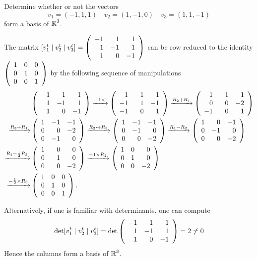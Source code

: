 \documentclass{ximera}
\author{Matthew Carr}
\begin{document}

\begin{exercise}\label{mc5_5A}

Determine whether or not the vectors  %
\[
v_1 = (-1,1,1) \quad v_2 = (1,-1,0) \quad v_3 = (1,1,-1)
\]
form a basis of $\mbox{$\Bbb{R}$}^3$.
  
\begin{solution}
\soln The matrix $[v_1^t\mid v_2^t\mid v_3^t]=\left(\begin{array}{rrrrrrrrrrrrrrrrrr} -1 & 1 & 1\\ 1 & -1 & 1\\ 1 & 0 & -1 \end{array}\right)$ can be row reduced to the identity $\left(\begin{array}{rrrrrrrrrrrrrrrrrr} 1 & 0 & 0\\ 0 & 1 & 0\\ 0 & 0 & 1 \end{array}\right)$ by the following sequence of manipulations
\begin{align*}
&\left(\begin{array}{rrrrrrrrrrrrrrrrrr} -1 & 1 & 1\\ 1 & -1 & 1\\ 1 & 0 & -1 \end{array}\right)\xrightarrow{-1\times }\left(\begin{array}{rrrrrrrrrrrrrrrrrr} 1 & -1 & -1\\ -1 & 1 & -1\\ -1 & 0 & 1 \end{array}\right)\xrightarrow{R_2+R_1}\left(\begin{array}{rrrrrrrrrrrrrrrrrr} 1 & -1 & -1\\ 0 & 0 & -2\\ -1 & 0 & 1 \end{array}\right)\\
\xrightarrow{R_3+R_1}&\left(\begin{array}{rrrrrrrrrrrrrrrrrr} 1 & -1 & -1\\ 0 & 0 & -2\\ 0 & -1 & 0 \end{array}\right)\xrightarrow{R_2\leftrightarrow R_3}\left(\begin{array}{rrrrrrrrrrrrrrrrrr} 1 & -1 &-1\\ 0 & -1 & 0\\ 0 & 0 & -2 \end{array}\right)\xrightarrow{R_1-R_2}\left(\begin{array}{rrrrrrrrrrrrrrrrrr} 1 & 0 &-1\\ 0 & -1 & 0\\ 0 & 0 & -2 \end{array}\right)\\
\xrightarrow{R_1-\frac{1}{2}R_3}&\left(\begin{array}{rrrrrrrrrrrrrrrrrr} 1 & 0 &0\\ 0 & -1 & 0\\ 0 & 0 & -2 \end{array}\right)\xrightarrow{-1\times R_2}\left(\begin{array}{rrrrrrrrrrrrrrrrrr} 1 & 0 &0\\ 0 & 1 & 0\\ 0 & 0 & -2 \end{array}\right)\\
\xrightarrow{-\frac{1}{2}\times R_3}&\left(\begin{array}{rrrrrrrrrrrrrrrrrr} 1 & 0 &0\\ 0 & 1 & 0\\ 0 & 0 & 1 \end{array}\right)\ldotp
\end{align*}


Alternatively, if one is familiar with determinants, one can compute
\[
\det [v_1^t \mid v_2^t \mid v_3^t] =\det\left(\begin{array}{rrrrrrrrrrrrrrrrrr} -1 & 1 & 1\\ 1 & -1 & 1\\ 1 & 0 & -1 \end{array}\right) = 2 \neq 0
\]
Hence the columns form a basis of $\mbox{$\Bbb{R}$}^3$.
\end{solution}
\end{exercise}
\end{document}
